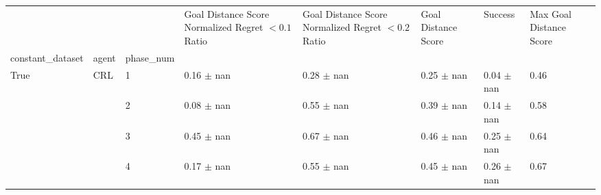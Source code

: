 \begin{tabular}{llllllll}
\toprule
 &  &  & Goal Distance Score Normalized Regret $< 0.1$ Ratio & Goal Distance Score Normalized Regret $< 0.2$ Ratio & Goal Distance Score & Success & Max Goal Distance Score \\
constant_dataset & agent & phase_num &  &  &  &  &  \\
\midrule
\multirow[t]{4}{*}{True} & \multirow[t]{4}{*}{CRL} & 1 & 0.16 $\pm$ nan & 0.28 $\pm$ nan & 0.25 $\pm$ nan & 0.04 $\pm$ nan & 0.46 \\
 &  & 2 & 0.08 $\pm$ nan & 0.55 $\pm$ nan & 0.39 $\pm$ nan & 0.14 $\pm$ nan & 0.58 \\
 &  & 3 & 0.45 $\pm$ nan & 0.67 $\pm$ nan & 0.46 $\pm$ nan & 0.25 $\pm$ nan & 0.64 \\
 &  & 4 & 0.17 $\pm$ nan & 0.55 $\pm$ nan & 0.45 $\pm$ nan & 0.26 $\pm$ nan & 0.67 \\
\cline{1-8} \cline{2-8}
\bottomrule
\end{tabular}
